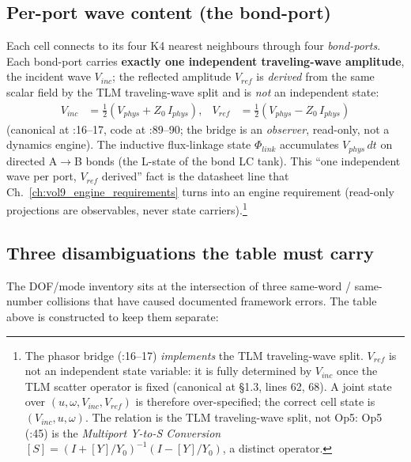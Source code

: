 \subsection{Per-port wave content (the bond-port)}
\label{subsec:vol9_per_port_wave_content}

Each cell connects to its four K4 nearest neighbours through four \emph{bond-ports}. Each bond-port carries \textbf{exactly one independent traveling-wave amplitude}, the incident wave $V_{inc}$; the reflected amplitude $V_{ref}$ is \emph{derived} from the same scalar field by the TLM traveling-wave split and is \emph{not} an independent state:
\begin{align}
V_{inc} &= \tfrac{1}{2}(V_{phys} + Z_0\, I_{phys}), &
V_{ref} &= \tfrac{1}{2}(V_{phys} - Z_0\, I_{phys})
\end{align}
(canonical at :16--17, code at :89--90; the bridge is an \emph{observer}, read-only, not a dynamics engine). The inductive flux-linkage state $\Phi_{link}$ accumulates $V_{phys}\,dt$ on directed A$\to$B bonds (the L-state of the bond LC tank). This ``one independent wave per port, $V_{ref}$ derived'' fact is the datasheet line that Ch.~\ref{ch:vol9_engine_requirements} turns into an engine requirement (read-only projections are observables, never state carriers).\footnote{The phasor bridge (:16--17) \emph{implements} the TLM traveling-wave split. $V_{ref}$ is not an independent state variable: it is fully determined by $V_{inc}$ once the TLM scatter operator is fixed (canonical at  \S1.3, lines 62, 68). A joint state over $(u, \omega, V_{inc}, V_{ref})$ is therefore over-specified; the correct cell state is $(V_{inc}, u, \omega)$. The relation is the TLM traveling-wave split, not Op5: Op5 (:45) is the \emph{Multiport Y-to-S Conversion} $[S] = (I + [Y]/Y_0)^{-1}(I - [Y]/Y_0)$, a distinct operator.}

\subsection{Three disambiguations the table must carry}
\label{subsec:vol9_dof_disambiguations}

The DOF/mode inventory sits at the intersection of three same-word / same-number collisions that have caused documented framework errors. The table above is constructed to keep them separate:


